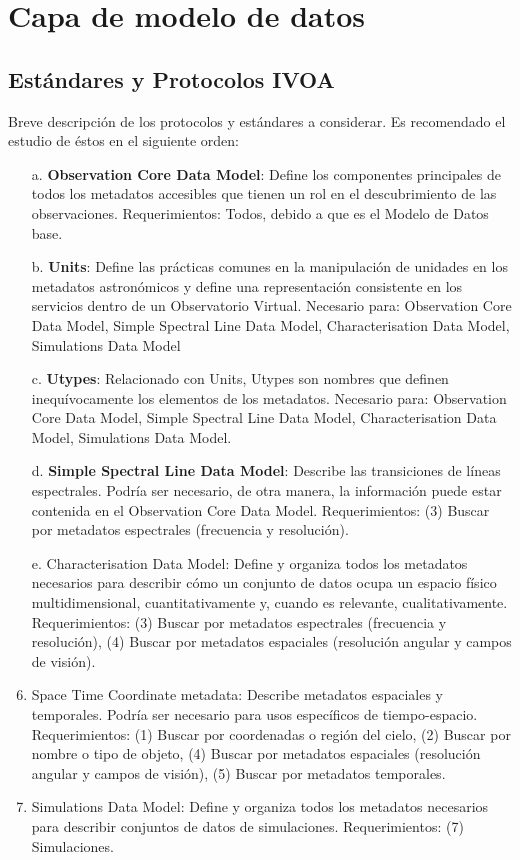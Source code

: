 \section{Capa de modelo de datos}
\subsection{Estándares y Protocolos IVOA}
Breve descripción de los protocolos y estándares a considerar. Es recomendado
el estudio de éstos en el siguiente orden:

\begin{enumerate}
	\item[a.] \textbf{Observation Core Data Model}: Define los componentes
principales de todos los metadatos accesibles que tienen un rol en el
descubrimiento de las observaciones.  Requerimientos: Todos, debido a que es el
Modelo de Datos base.  

	\item[b.] \textbf{Units}: Define las prácticas comunes en la
manipulación de unidades en los metadatos astronómicos y define una
representación consistente en los servicios dentro de un Observatorio Virtual.
Necesario para: Observation Core Data Model, Simple Spectral Line Data Model,
Characterisation Data Model, Simulations Data Model

	\item[c.] \textbf{Utypes}: Relacionado con Units, Utypes son nombres
que definen inequívocamente los elementos de los metadatos. Necesario para:
Observation Core Data Model, Simple Spectral Line Data Model, Characterisation
Data Model, Simulations Data Model.

	\item[d.] \textbf{Simple Spectral Line Data Model}: Describe las
transiciones de líneas espectrales. Podría ser necesario, de otra manera, la
información puede estar contenida en el Observation Core Data Model.
Requerimientos: (3) Buscar por metadatos espectrales (frecuencia y resolución).

	\item[e.] Characterisation Data Model: Define y organiza todos los
metadatos necesarios para describir cómo un conjunto de datos ocupa un espacio
físico multidimensional, cuantitativamente y, cuando es relevante,
cualitativamente. Requerimientos: (3) Buscar por metadatos espectrales
(frecuencia y resolución), (4) Buscar por metadatos espaciales (resolución
angular y campos de visión).

	\item Space Time Coordinate metadata: Describe metadatos espaciales y
temporales. Podría ser necesario para usos específicos de tiempo-espacio.
Requerimientos: (1) Buscar por coordenadas o región del cielo, (2) Buscar por
nombre o  tipo de objeto, (4) Buscar por metadatos espaciales (resolución
angular y campos de visión), (5) Buscar por metadatos temporales.

	\item Simulations Data Model: Define y organiza todos los metadatos
necesarios para describir conjuntos de datos de simulaciones. Requerimientos:
(7) Simulaciones.
\end{enumerate}

